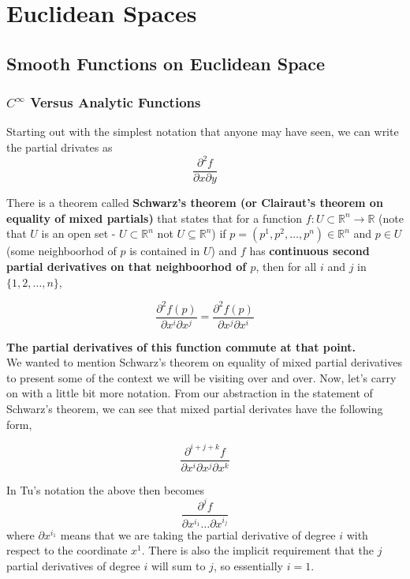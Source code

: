 \section{Euclidean Spaces}


\subsection{Smooth Functions on Euclidean Space}

\subsubsection{$C^\infty$ Versus Analytic Functions}

Starting out with the simplest notation that anyone may have seen, we can write the partial drivates
as
$$
\frac{\partial^2 f}{\partial x \partial y}
$$

There is a theorem called \textbf{Schwarz's theorem (or Clairaut's theorem on equality of mixed partials)}
that states that for a function $f : U \subset \mathbb{R}^n \rightarrow \mathbb{R} $
(note that $U$ is an open set - $U \subset \mathbb{R}^n$ not $U \subseteq \mathbb{R}^n$)
if $p = (p^1, p^2, \ldots , p^n) \in \mathbb{R}^n$
and $p \in U$ (some neighboorhod of $p$ is contained in $U$)
and $f$ has \textbf{continuous second partial derivatives on that neighboorhod of $p$},
then for all $i$ and $j$ in $\{ 1, 2, \ldots , n \}$,

$$
\frac{\partial^2 f (p)}{\partial x^i \partial x^j}
= \frac{\partial^2 f (p)}{\partial x^j \partial x^i}
$$

\textbf{The partial derivatives of this function commute at that point.}
\\

We wanted to mention Schwarz's theorem on equality of mixed partial derivatives to present some of the context
we will be visiting over and over.
Now, let's carry on with a little bit more notation.
From our abstraction in the statement of Schwarz's theorem, we can see that mixed partial derivates have the following
form,

$$
\frac{\partial^{i+j+k} f}{\partial x^i \partial x^j \partial x^k}
$$

In Tu's notation the above then becomes
$$
\frac{\partial^j f}{\partial x^{i_1} \ldots \partial x^{i_j}}
$$
where $\partial x^{i_1}$ means that we are taking the partial derivative of degree $i$ with respect to the
coordinate $x^1$.
There is also the implicit requirement that the $j$ partial derivatives of degree $i$ will sum to $j$, so essentially
$i=1$.

